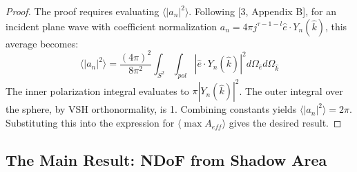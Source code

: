 \documentclass[11pt,a4paper]{article}
\begin{document}
\begin{proof}
The proof requires evaluating \(\langle|a_{n}|^{2}\rangle\). Following [3, Appendix B], for an incident plane wave with coefficient normalization \(a_{n}=4\pi j^{\tau-1-l}\hat{e}\cdot Y_{n}(\hat{k})\), this average becomes:
\begin{equation}
    \langle|a_{n}|^{2}\rangle=\frac{(4\pi)^{2}}{8\pi^{2}}\int_{S^{2}}\int_{pol}|\hat{e}\cdot Y_{n}(\hat{k})|^{2}d\Omega_{\hat{e}}d\Omega_{\hat{k}}
\end{equation}
The inner polarization integral evaluates to \(\pi|Y_{n}(\hat{k})|^{2}\). The outer integral over the sphere, by VSH orthonormality, is 1. Combining constants yields \(\langle|a_{n}|^{2}\rangle=2\pi\). Substituting this into the expression for \(\langle \max A_{eff}\rangle\) gives the desired result.
\end{proof}

\subsection{The Main Result: NDoF from Shadow Area}
\end{document}
